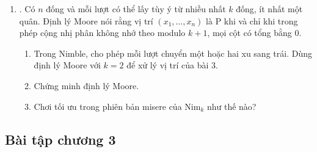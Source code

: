 \documentclass[11pt]{article}
\begin{document}
\begin{enumerate}
  \item {}. Có \(n\) đống và mỗi lượt có thể lấy tùy
  ý từ nhiều nhất \(k\) đống, ít nhất một quân. Định lý Moore nói rằng vị trí
  \((x_1,\ldots,x_n)\) là P khi và chỉ khi trong phép cộng nhị phân không nhớ
  theo modulo \(k+1\), mọi cột có tổng bằng \(0\).
  \begin{enumerate}
    \item Trong Nimble, cho phép mỗi lượt chuyển một hoặc hai xu sang trái.
    Dùng định lý Moore với \(k=2\) để xử lý vị trí của bài 3.
    \item Chứng minh định lý Moore.
    \item Chơi tối ưu trong phiên bản misere của Nim\(_k\) như thế nào?
  \end{enumerate}
\end{enumerate}

\subsection{Bài tập chương 3}
\end{document}
